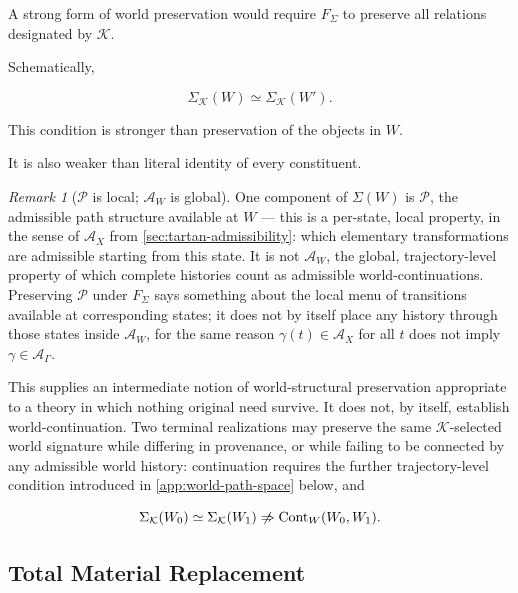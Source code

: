 \documentclass[
  11pt,
  a4paper,
  DIV=12,
  BCOR=0mm,
  parskip=half-
]{scrartcl}
\newcommand{\Cont}{\operatorname{Cont}}
\theoremstyle{definition}
\theoremstyle{plain}
\theoremstyle{remark}
\newtheorem{remark}[definition]{Remark}
\begin{document}
A strong form of world preservation would require \(F_\Sigma\) to preserve all
relations designated by \(\mathcal K\).

Schematically,

\[
  \Sigma_{\mathcal K}(W)
  \simeq
  \Sigma_{\mathcal K}(W').
\]

This condition is stronger than preservation of the objects in \(W\).

It is also weaker than literal identity of every constituent.

\begin{remark}[\(\mathcal P\) is local; \(\mathcal A_W\) is global]
\label{rem:P-vs-AW}
One component of \(\Sigma(W)\) is \(\mathcal P\), the admissible path
structure available at \(W\) — this is a per-state, local property, in the
sense of \(\mathcal A_X\) from \cref{sec:tartan-admissibility}: which
elementary transformations are admissible starting from this state. It is
not \(\mathcal A_W\), the global, trajectory-level property of which
complete histories count as admissible world-continuations. Preserving
\(\mathcal P\) under \(F_\Sigma\) says something about the local menu of
transitions available at corresponding states; it does not by itself place
any history through those states inside \(\mathcal A_W\), for the same
reason \(\gamma(t)\in\mathcal A_X\) for all \(t\) does not imply
\(\gamma\in\mathcal A_\Gamma\).
\end{remark}

This supplies an intermediate notion of world-structural preservation
appropriate to a theory in which nothing original need survive. It does not,
by itself, establish world-continuation. Two terminal realizations may
preserve the same \(\mathcal K\)-selected world signature while differing in
provenance, or while failing to be connected by any admissible world
history: continuation requires the further trajectory-level condition
introduced in \cref{app:world-path-space} below, and

\[
  \Sigma_{\mathcal K}(W_0)
  \simeq
  \Sigma_{\mathcal K}(W_1)
  \centernot\Rightarrow
  \Cont_W(W_0,W_1).
\]


\subsection{Total Material Replacement}
\label{app:total-replacement}
\end{document}
